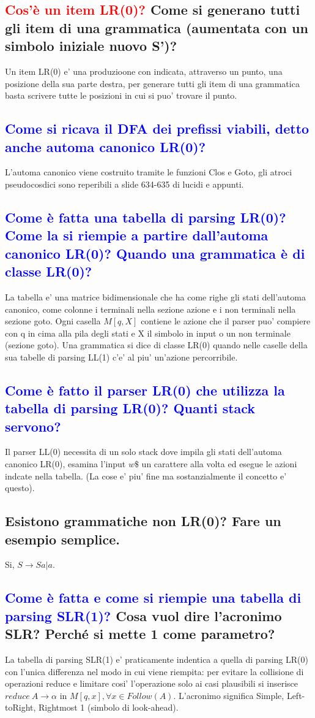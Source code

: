 \documentclass{article}
\begin{document}
\subsection{\textcolor{red}{Cos'è un item LR(0)?} Come si generano tutti gli item di una grammatica (aumentata con un simbolo iniziale nuovo S')?}
Un item LR(0) e' una produzioone con indicata, attraverso un punto, una posizione della sua parte destra, per generare tutti gli item di una grammatica basta scrivere tutte le posizioni in cui si puo' trovare il punto.
\subsection{\textcolor{blue}{Come si ricava il DFA dei prefissi viabili, detto anche automa canonico LR(0)?}}
L'automa canonico viene costruito tramite le funzioni Clos e Goto, gli atroci pseudocosdici sono reperibili a slide 634-635 di lucidi e appunti.
\subsection{\textcolor{blue}{Come è fatta una tabella di parsing LR(0)? Come la si riempie a partire dall'automa canonico LR(0)? Quando una grammatica è di classe LR(0)?}}
La tabella e' una matrice bidimensionale che ha come righe gli stati dell'automa canonico, come colonne i terminali nella sezione azione e i non terminali nella sezione goto.
Ogni casella $M[q,X]$ contiene le azione che il parser puo' compiere con q in cima alla pila degli stati e X il simbolo in input o un non terminale (sezione goto).
Una grammatica si dice di classe LR(0) quando nelle caselle della sua tabelle di parsing LL(1) c'e' al piu' un'azione percorribile.
\subsection{\textcolor{blue}{Come è fatto il parser LR(0) che utilizza la tabella di parsing LR(0)? Quanti stack servono?}}
Il parser LL(0) necessita di un solo stack dove impila gli stati dell'automa canonico LR(0), esamina l'input $w \$ $ un carattere alla volta ed esegue le azioni indcate nella tabella. (La cose e' piu' fine ma sostanzialmente il concetto e' questo).

    \subsection{Esistono grammatiche non LR(0)? Fare un esempio semplice.}
    Si, $S \to Sa|a$.
    \subsection{\textcolor{blue}{Come è fatta e come si riempie una tabella di parsing SLR(1)?} Cosa vuol dire l'acronimo SLR? Perché si mette 1 come parametro?}
    La tabella di parsing SLR(1) e' praticamente indentica a quella di parsing LR(0) con l'unica differenza nel modo in cui viene riempita: per evitare
    la collisione di operazioni reduce e limitare cosi' l'operazione solo ai casi plausibili si inserisce $reduce \ A \to\alpha$ in $M[q,x], \forall x \in
Follow(A)$. L'acronimo significa Simple, Left-toRight, Rightmost 1 (simbolo di look-ahead).
\end{document}
